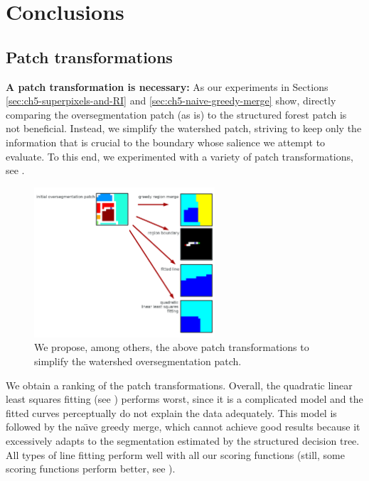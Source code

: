 \section{Conclusions}

\subsection{Patch transformations}

\textbf{A patch transformation is necessary:} As our experiments in Sections \ref{sec:ch5-superpixels-and-RI} and \ref{sec:ch5-naive-greedy-merge} show, directly comparing the oversegmentation patch (as is) to the structured forest patch is not beneficial. Instead, we simplify the watershed patch, striving %
to keep only the information that is crucial to the boundary whose salience we attempt %
to evaluate. To this end, we experimented with a variety of patch transformations, see .

\begin{figure}[t]
\centering
\includegraphics[width=0.6\textwidth]{images/conclusions/patch-transformations.png}
\caption[Proposed watershed patch transformations]{We propose, among others, the above patch transformations to simplify the watershed oversegmentation patch.}
\label{fig:patch-transformations}
\end{figure}

We obtain a ranking of the patch transformations. Overall, the quadratic linear least squares fitting (see ) performs worst, since it is a complicated model and the fitted curves perceptually do not explain the data adequately. %
This model is followed by the na\"{\i}ve greedy merge, which cannot achieve good results because it excessively adapts to the segmentation estimated by the structured decision tree. All types of line fitting perform well with all our scoring functions (still, some scoring functions perform better, see ).

